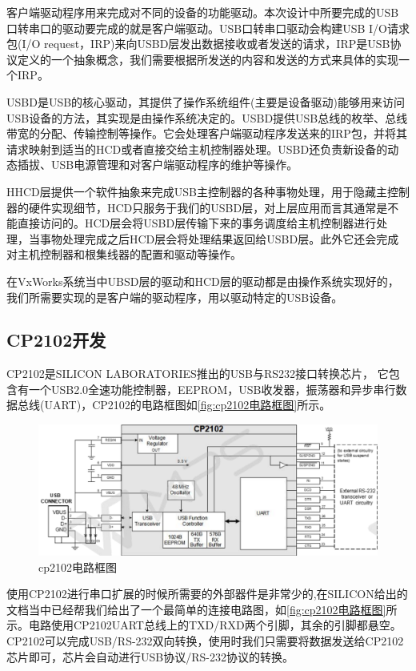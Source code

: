 	客户端驱动程序用来完成对不同的设备的功能驱动。本次设计中所要完成的USB口转串口的驱动要完成的就是客户端驱动。USB口转串口驱动会构建USB I/O请求包(I/O request，IRP)来向USBD层发出数据接收或者发送的请求，IRP是USB协议定义的一个抽象概念，我们需要根据所发送的内容和发送的方式来具体的实现一个IRP\cite{李雪红2004USB}。
	
	USBD是USB的核心驱动，其提供了操作系统组件(主要是设备驱动)能够用来访问USB设备的方法，其实现是由操作系统决定的。USBD提供USB总线的枚举、总线带宽的分配、传输控制等操作。它会处理客户端驱动程序发送来的IRP包，并将其请求映射到适当的HCD或者直接交给主机控制器处理。USBD还负责新设备的动态插拔、USB电源管理和对客户端驱动程序的维护等操作。
	
	HHCD层提供一个软件抽象来完成USB主控制器的各种事物处理，用于隐藏主控制器的硬件实现细节，HCD只服务于我们的USBD层，对上层应用而言其通常是不能直接访问的。HCD层会将USBD层传输下来的事务调度给主机控制器进行处理，当事物处理完成之后HCD层会将处理结果返回给USBD层。此外它还会完成对主机控制器和根集线器的配置和驱动等操作\cite{李雪红2004USB}。
	
	在VxWorks系统当中UBSD层的驱动和HCD层的驱动都是由操作系统实现好的，我们所需要实现的是客户端的驱动程序，用以驱动特定的USB设备。
	


\subsection{CP2102开发}
	
	CP2102是SILICON LABORATORIES推出的USB与RS232接口转换芯片，
	它包含有一个USB2.0全速功能控制器，EEPROM，USB收发器，振荡器和异步串行数据总线(UART)，CP2102的电路框图如\autoref{fig:cp2102电路框图}所示。

\begin{figure}[!h]
\centering
\includegraphics[width=1.0\textwidth]{./graphics/cp2102-circuit-diagram.pdf}
\caption{cp2102电路框图}\label{fig:cp2102电路框图}
\end{figure}

	使用CP2102进行串口扩展的时候所需要的外部器件是非常少的,在SILICON给出的文档当中已经帮我们给出了一个最简单的连接电路图，如\autoref{fig:cp2102电路框图}所示。电路使用CP2102UART总线上的TXD/RXD两个引脚，其余的引脚都悬空。CP2102可以完成USB/RS-232双向转换，使用时我们只需要将数据发送给CP2102芯片即可，芯片会自动进行USB协议/RS-232协议的转换。
		
